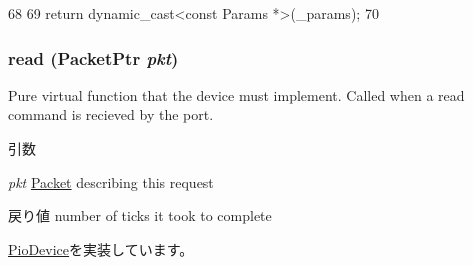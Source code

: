 \begin{DoxyCode}
68     {
69         return dynamic_cast<const Params *>(_params);
70     }
\end{DoxyCode}
\hypertarget{classMaltaPChip_a613ec7d5e1ec64f8d21fec78ae8e568e}{
\subsubsection[{read}]{ read ({\bf PacketPtr} {\em pkt})}}
\label{classMaltaPChip_a613ec7d5e1ec64f8d21fec78ae8e568e}
Pure virtual function that the device must implement. Called when a read command is recieved by the port. 
\begin{DoxyParams}{引数}
\item[{\em pkt}]\hyperlink{classPacket}{Packet} describing this request \end{DoxyParams}
\begin{DoxyReturn}{戻り値}
number of ticks it took to complete 
\end{DoxyReturn}


\hyperlink{classPioDevice_a842312590432036092c422c87a442358}{PioDevice}を実装しています。


